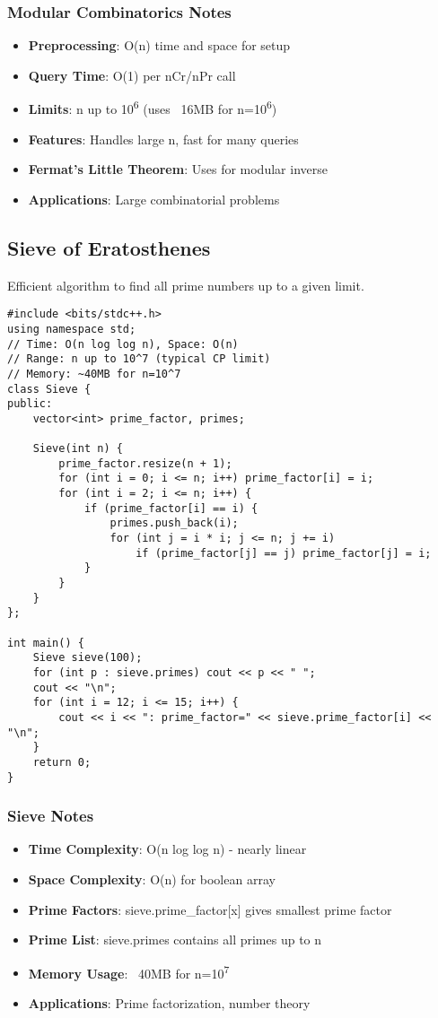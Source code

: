 \documentclass[11pt,a4paper]{article}
\begin{document}
\subsubsection*{Modular Combinatorics Notes}
\begin{itemize}
\item \textbf{Preprocessing}: O(n) time and space for setup
\item \textbf{Query Time}: O(1) per nCr/nPr call
\item \textbf{Limits}: n up to 10\textsuperscript{6} (uses ~16MB for n=10\textsuperscript{6})
\item \textbf{Features}: Handles large n, fast for many queries
\item \textbf{Fermat's Little Theorem}: Uses for modular inverse
\item \textbf{Applications}: Large combinatorial problems
\end{itemize}

\newpage
\subsection{Sieve of Eratosthenes}
Efficient algorithm to find all prime numbers up to a given limit.

\begin{lstlisting}[caption={Sieve of Eratosthenes}]
#include <bits/stdc++.h>
using namespace std;
// Time: O(n log log n), Space: O(n)
// Range: n up to 10^7 (typical CP limit)
// Memory: ~40MB for n=10^7
class Sieve {
public:
    vector<int> prime_factor, primes;
    
    Sieve(int n) {
        prime_factor.resize(n + 1);
        for (int i = 0; i <= n; i++) prime_factor[i] = i;
        for (int i = 2; i <= n; i++) {
            if (prime_factor[i] == i) {
                primes.push_back(i);
                for (int j = i * i; j <= n; j += i)
                    if (prime_factor[j] == j) prime_factor[j] = i;
            }
        }
    }
};

int main() {
    Sieve sieve(100);
    for (int p : sieve.primes) cout << p << " ";
    cout << "\n";
    for (int i = 12; i <= 15; i++) {
        cout << i << ": prime_factor=" << sieve.prime_factor[i] << "\n";
    }  
    return 0;
}
\end{lstlisting}

\subsubsection*{Sieve Notes}
\begin{itemize}
\item \textbf{Time Complexity}: O(n log log n) - nearly linear
\item \textbf{Space Complexity}: O(n) for boolean array
\item \textbf{Prime Factors}: sieve.prime\_factor[x] gives smallest prime factor
\item \textbf{Prime List}: sieve.primes contains all primes up to n
\item \textbf{Memory Usage}: ~40MB for n=10\textsuperscript{7}
\item \textbf{Applications}: Prime factorization, number theory
\end{itemize}
\end{document}
